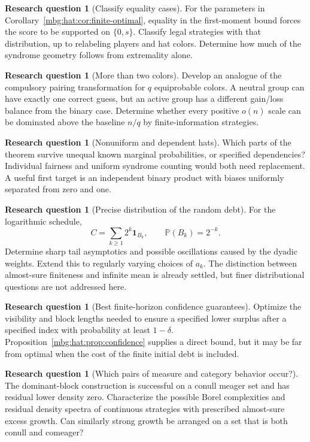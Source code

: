 \documentclass[11pt,letterpaper]{article}
\theoremstyle{definition}
\newcommand{\Prb}{\mathbb P}
\newcommand{\ind}{\mathbf 1}
\newtheorem{question}[theorem]{Research question}
\begin{document}
\begin{question}[Classify equality cases]
For the parameters in Corollary~\ref{mbg:hat:cor:finite-optimal}, equality in
the first-moment bound forces the score to be supported on
\(\{0,s\}\). Classify legal strategies with that distribution,
up to relabeling players and hat colors. Determine how much of
the syndrome geometry follows from extremality alone.
\end{question}

\begin{question}[More than two colors]
Develop an analogue of the compulsory pairing transformation for
\(q\) equiprobable colors. A neutral group can have exactly one
correct guess, but an active group has a different gain/loss
balance from the binary case. Determine whether every
positive \(o(n)\) scale can be dominated above the baseline \(n/q\)
by finite-information strategies.
\end{question}

\begin{question}[Nonuniform and dependent hats]
Which parts of the theorem survive unequal known marginal
probabilities, or specified dependencies? Individual fairness
and uniform syndrome counting would both need replacement.
A useful first target is an independent binary product with
biases uniformly separated from zero and one.
\end{question}

\begin{question}[Precise distribution of the random debt]
For the logarithmic schedule,
\[
  C=\sum_{k\ge1}2^k\ind_{B_k},\qquad
  \Prb(B_k)=2^{-k}.
\]
Determine sharp tail asymptotics and possible oscillations caused
by the dyadic weights. Extend this to regularly varying choices
of \(a_k\). The distinction between almost-sure finiteness and
infinite mean is already settled, but finer distributional
questions are not addressed here.
\end{question}

\begin{question}[Best finite-horizon confidence guarantees]
Optimize the visibility and block lengths needed to ensure a
specified lower surplus after a specified index with probability
at least \(1-\delta\). Proposition~\ref{mbg:hat:prop:confidence} supplies
a direct bound, but it may be far from optimal when the cost of
the finite initial debt is included.
\end{question}

\begin{question}[Which pairs of measure and category behavior occur?]
The dominant-block construction is successful on a conull meager
set and has residual lower density zero. Characterize the
possible Borel complexities and residual density spectra of
continuous strategies with prescribed almost-sure excess growth.
Can similarly strong growth be arranged on a set that is both
conull and comeager?
\end{question}
\end{document}

